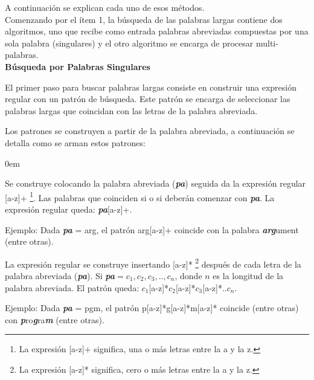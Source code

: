 A continuación se explican cada uno de esos métodos.\\

Comenzando por el ítem 1, la búsqueda de las palabras largas contiene dos algoritmos, uno que recibe como entrada palabras abreviadas compuestas por una sola palabra (singulares) y el otro algoritmo se encarga de procesar multi-palabras.\\

\noindent \textbf{Búsqueda por Palabras Singulares\\}

El primer paso para buscar palabras largas consiste en construir una expresión regular con un patrón de búsqueda.  Este patrón se encarga de seleccionar las palabras largas que coincidan con las letras de la palabra abreviada.

Los patrones se construyen a partir de la palabra abreviada, a continuación se detalla como se arman estos patrones: 

\begin{description}
\itemsep0em%
\item[Patrón prefijo:] Se construye colocando la palabra abreviada (\textit{\textbf{pa}}) seguida da la expresión regular [a-z]+ \footnote[1]{La expresión [a-z]+ significa, una o más letras entre la a y la z.}. Las palabras que coinciden si o si deberán comenzar con \textit{\textbf{pa}}. La expresión regular queda: \textit{\textbf{pa}}[a-z]+.

Ejemplo: Dada \textit{\textbf{pa}} = \textsf{arg}, el patrón \textsf{arg}[a-z]+ coincide con la palabra \textit{\textbf{arg}}ument (entre otras).

\item[Patrón compuesto por letras:]  La expresión regular se construye insertando [a-z]* \footnote[1]{La expresión [a-z]* significa, cero o más letras entre la a y la z.} después de cada letra de la palabra abreviada (\textit{\textbf{pa}}). Si \textit{\textbf{pa}}$=c_{1},c_{2},c_{3},..,c_{n}$, donde $n$ es la longitud de la palabra abreviada. El patrón queda: $c_{1}$[a-z]*$c_{2}$[a-z]*$c_{3}$[a-z]*..$c_{n}$.

Ejemplo: Dada \textit{\textbf{pa}} = \textsf{pgm}, el patrón \textsf{p}[a-z]*\textsf{g}[a-z]*\textsf{m}[a-z]* coincide (entre otras) con  \textit{\textbf{p}}ro\textit{\textbf{g}}ra\textit{\textbf{m}} (entre otras).
\end{description}



